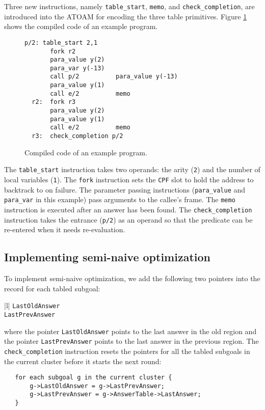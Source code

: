 \documentclass{tlp}
\begin{document}
Three new instructions, namely {\tt table\_start}, {\tt memo}, and {\tt check\_completion}, are introduced into the ATOAM for encoding the three table primitives. Figure \ref{fig:ins} shows the compiled code of an example program.
\begin{figure}
\begin{verbatim}
p/2: table_start 2,1
       fork r2
       para_value y(2)
       para_var y(-13)
       call p/2          para_value y(-13)
       para_value y(1)
       call e/2          memo
  r2:  fork r3
       para_value y(2)
       para_value y(1)
       call e/2          memo
  r3:  check_completion p/2
\end{verbatim}
\caption{\label{fig:ins}Compiled code of an example program.}
\end{figure}

The {\tt table\_start} instruction takes two operands: the arity ({\tt 2}) and the number of local variables ({\tt 1}). The {\tt fork} instruction sets the {\tt CPF} slot to hold the address to backtrack to on failure. The parameter passing instructions ({\tt para\_value} and {\tt para\_var} in this example) pass arguments to the callee's frame. The {\tt memo} instruction is executed after an answer has been found. The {\tt check\_completion} instruction takes the entrance ({\tt p/2}) as an operand so that the predicate can be re-entered when it needs re-evaluation.

\subsection{Implementing semi-naive optimization}
To implement semi-naive optimization, we add the following two pointers into the record for each tabled subgoal:
\begin{center}
\begin{oldtabular}{|l|}  \oldhline
{\tt LastOldAnswer} \\ \oldhline
{\tt LastPrevAnswer} \\ \oldhline
\end{oldtabular}
\end{center}
where the pointer {\tt LastOldAnswer} points to the last answer in the old region and the pointer {\tt LastPrevAnswer} points to the last answer in the previous region. The {\tt check\_completion} instruction resets the pointers for all the tabled subgoals in the current cluster before it starts the next round:
\begin{verbatim}
   for each subgoal g in the current cluster {
       g->LastOldAnswer = g->LastPrevAnswer;
       g->LastPrevAnswer = g->AnswerTable->LastAnswer;
   }
\end{verbatim}
\end{document}

